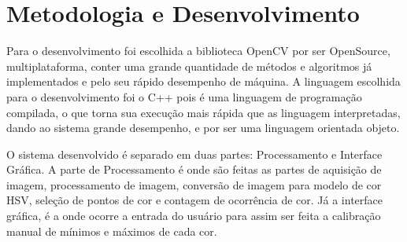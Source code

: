 	
	
	\chapter{Metodologia e Desenvolvimento} \label{Cap:Processamento}
	
			Para o desenvolvimento foi escolhida a biblioteca OpenCV por ser OpenSource, multiplataforma, conter uma grande quantidade de métodos e algoritmos já implementados	e pelo seu rápido desempenho de máquina.
			A linguagem escolhida para o desenvolvimento foi o C++ pois é uma linguagem de programação compilada, o que torna sua execução mais rápida que as linguagem interpretadas, dando ao sistema grande desempenho, e por ser uma linguagem orientada objeto. 
			
			O sistema desenvolvido é separado em duas partes: Processamento e Interface Gráfica.
			A parte de Processamento é onde são feitas as partes de aquisição de imagem, processamento de imagem, conversão de imagem para modelo de cor HSV, seleção de pontos de cor e contagem de ocorrência de cor. Já a interface gráfica, é a onde ocorre a entrada do usuário para assim ser feita a calibração manual de mínimos e máximos de cada cor.
		
